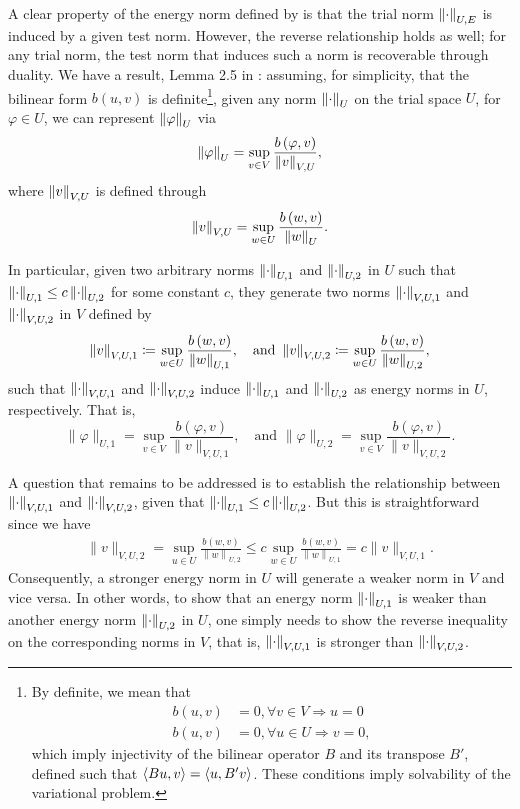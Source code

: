 A clear property of the energy norm defined by  is that the trial norm $\nor{\cdot}_{U,E}$ is induced by a given test norm. However, the reverse relationship holds as well; for any trial norm, the test norm that induces such a norm is recoverable through duality. We have a result, Lemma 2.5 in \cite{Bui-ThanhDemkowiczGhattas11a}: assuming, for simplicity, that the bilinear form $b(u,v)$ is definite\footnote{By definite, we mean that \begin{align*}b(u,v) &= 0, \forall v\in V \Rightarrow u = 0\\ b(u,v)&=0, \forall u\in U \Rightarrow v = 0,\end{align*}  which imply injectivity of the bilinear operator $B$ and its transpose $B'$, defined such that $\LRa{Bu,v} = \LRa{u,B'v}$.  These conditions imply solvability of the variational problem.}, given any norm $\nor{\cdot}_{U}$ on the trial space $U$, for $\varphi \in U$, we can represent $\nor{\varphi}_{U}$ via
\[
\nor{\varphi}_{U} = \sup_{v \in V}\frac{b\LRp{\varphi,v}}{\nor{v}_{V,U}},
\]
where $\nor{v}_{V,U}$ is defined through
\[
\nor{v}_{V,U} = \sup_{w \in U}\frac{b\LRp{w,v}}{\nor{w}_{U}}.
\]

In particular, given two arbitrary norms $\nor{\cdot}_{U,1}$ and $\nor{\cdot}_{U,2}$ in $U$
such that $\nor{\cdot}_{U,1} \le c \nor{\cdot}_{U,2}$ for some constant
$c$, they generate two norms $\nor{\cdot}_{V,U,1}$ and
$\nor{\cdot}_{V,U,2}$ in $V$ defined by
\[
\nor{v}_{V,U,1} \coloneqq \sup_{w \in U}\frac{b\LRp{w,v}}{\nor{w}_{U,1}}, \quad
\text{and }\nor{v}_{V,U,2} \coloneqq \sup_{w \in U}\frac{b\LRp{w,v}}{\nor{w}_{U,2}},
\]
such that $\nor{\cdot}_{V,U,1}$ and $\nor{\cdot}_{V,U,2}$ induce
$\nor{\cdot}_{U,1}$ and $\nor{\cdot}_{U,2}$ as energy
norms in $U$, respectively. That is,
\[
\|\varphi\|_{U,1} = \sup_{v\in V}
\frac{b(\varphi,v)}{\|v\|_{V,U,1}}, \quad \text{and }\|\varphi\|_{U,2} = \sup_{v\in V}
\frac{b(\varphi,v)}{\|v\|_{V,U,2}}.
\]

A question that remains to be addressed is to establish the relationship
between $\nor{\cdot}_{V,U,1}$ and $\nor{\cdot}_{V,U,2}$, given that
$\nor{\cdot}_{U,1} \le c \nor{\cdot}_{U,2}$. But this is
straightforward since we have
\begin{align*}
 \| v \|_{V,U,2} = \sup_{u \in U} \frac{b\left(w,v\right)}{\left\|
  w \right\|_{U,2}} \le c\sup_{w \in U} \frac{b\left(w,v\right)}{\left\| w
  \right\|_{U,1}} = c\| v \|_{V,U,1}.
\end{align*}
Consequently, a stronger energy norm in $U$ will generate a weaker
norm in $V$ and vice versa. In other words, to show that an
energy norm $\nor{\cdot}_{U,1}$ is weaker than another energy norm
$\nor{\cdot}_{U,2}$ in $U$, one simply needs to show the reverse inequality on the
corresponding norms in $V$, that is, $\nor{\cdot}_{V,U,1}$ is stronger
than $\nor{\cdot}_{V,U,2}$.

